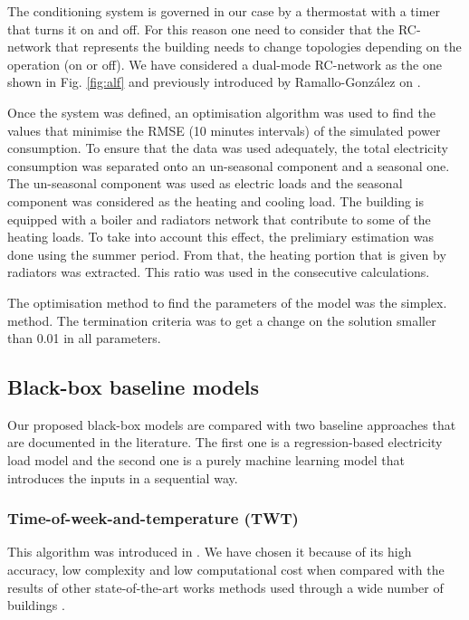 \documentclass[10pt, conference, compsocconf]{IEEEtran}
\begin{document}
The conditioning system is governed in our case by a thermostat with a timer that turns it on and off. For this reason one need to consider that the RC-network that represents the building needs to change topologies depending on the operation (on or off). We have considered a dual-mode RC-network as the one shown in Fig. \ref{fig:alf} and previously introduced by Ramallo-Gonz\'alez on \cite{ramalloidentifying}.




Once the system was defined, an optimisation algorithm was used to find the values that minimise the RMSE (10 minutes intervals) of the simulated power consumption. To ensure that the data was used adequately, the total electricity consumption was separated onto an un-seasonal component and a seasonal one. The un-seasonal component was used as electric loads and the seasonal component was considered as the heating and cooling load. The building is equipped with a boiler and radiators network that contribute to some of the heating loads. To take into account this effect, the prelimiary estimation was done using the summer period. From that, the heating portion that is given by radiators was extracted. This ratio was used in the consecutive calculations.

The optimisation method to find the parameters of the model was the simplex. method. The termination criteria was to get a change on the solution smaller than 0.01 in all parameters. %

\subsection{Black-box baseline models}

Our proposed black-box models are compared with two baseline approaches that are documented in the literature. The first one is a regression-based electricity load model and the second one is a purely machine learning model that introduces the inputs in a sequential way. 


\subsubsection{Time-of-week-and-temperature (TWT)}

This algorithm was introduced in \cite{mathieu2011quantifying}. We have chosen it because of its high accuracy, low complexity and low computational cost when compared with the results of other state-of-the-art works methods used through a wide number of buildings \cite{granderson2016accuracy}. 
\end{document}
